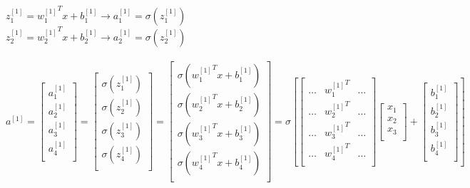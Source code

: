 \documentclass{article}
\begin{document}
$z_{1}^{[1]} = {w_{1}^{[1]}}^T x + b_{1}^{[1]} \rightarrow a_{1}^{[1]} = \sigma(z_{1}^{[1]})$\\

$z_{2}^{[1]} = {w_{2}^{[1]}}^T x + b_{2}^{[1]} \rightarrow a_{2}^{[1]} = \sigma(z_{2}^{[1]})$\\\\


$a^{[1]} =
\begin{bmatrix}
a_{1}^{[1]} \\
a_{2}^{[1]} \\
a_{3}^{[1]} \\
a_{4}^{[1]} \\
\end{bmatrix}
=
\begin{bmatrix}
\sigma(z_{1}^{[1]}) \\
\sigma(z_{2}^{[1]}) \\
\sigma(z_{3}^{[1]}) \\
\sigma(z_{4}^{[1]}) \\
\end{bmatrix}
=
\begin{bmatrix}
\sigma({w_{1}^{[1]}}^T x +b_{1}^{[1]}) \\
\sigma({w_{2}^{[1]}}^T x +b_{2}^{[1]}) \\
\sigma({w_{3}^{[1]}}^T x +b_{3}^{[1]}) \\
\sigma({w_{4}^{[1]}}^T x +b_{4}^{[1]}) \\
\end{bmatrix}
=
\sigma[
\begin{bmatrix}
\dots & {w_{1}^{[1]}}^T & \dots \\
\dots & {w_{2}^{[1]}}^T & \dots \\
\dots & {w_{3}^{[1]}}^T & \dots \\
\dots & {w_{4}^{[1]}}^T & \dots \\
\end{bmatrix}
\begin{bmatrix}
x_{1} \\
x_{2} \\
x_{3} \\
\end{bmatrix} +
\begin{bmatrix}
b_{1}^{[1]} \\
b_{2}^{[1]} \\
b_{3}^{[1]} \\
b_{4}^{[1]} \\
\end{bmatrix}
]
$\\
\end{document}
